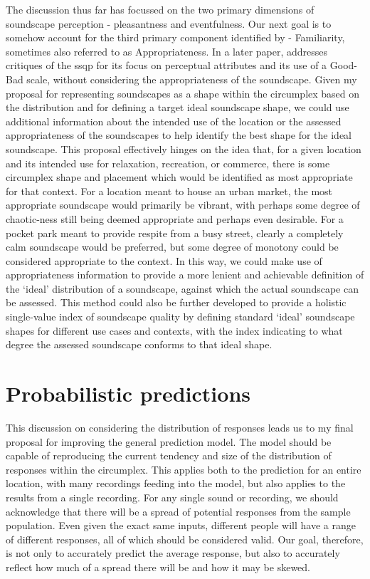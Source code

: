 The discussion thus far has focussed on the two primary dimensions of soundscape perception - pleasantness and eventfulness. Our next goal is to somehow account for the third primary component identified by \citet{Axelsson2010principal} - Familiarity, sometimes also referred to as Appropriateness. In a later paper, \citet{Axelsson2015How} addresses critiques of the \gls{ssqp} for its focus on perceptual attributes and its use of a Good-Bad scale, without considering the appropriateness of the soundscape. Given my proposal for representing soundscapes as a shape within the circumplex based on the distribution and for defining a target ideal soundscape shape, we could use additional information about the intended use of the location or the assessed appropriateness of the soundscapes to help identify the best shape for the ideal soundscape. This proposal effectively hinges on the idea that, for a given location and its intended use for relaxation, recreation, or commerce, there is some circumplex shape and placement which would be identified as most appropriate for that context. For a location meant to house an urban market, the most appropriate soundscape would primarily be vibrant, with perhaps some degree of chaotic-ness still being deemed appropriate and perhaps even desirable. For a pocket park meant to provide respite from a busy street, clearly a completely calm soundscape would be preferred, but some degree of monotony could be considered appropriate to the context. In this way, we could make use of appropriateness information to provide a more lenient and achievable definition of the `ideal' distribution of a soundscape, against which the actual soundscape can be assessed. This method could also be further developed to provide a holistic single-value index of soundscape quality by defining standard `ideal' soundscape shapes for different use cases and contexts, with the index indicating to what degree the assessed soundscape conforms to that ideal shape.

\section{Probabilistic predictions}
\label{sec:probPred}
This discussion on considering the distribution of responses leads us to my final proposal for improving the general prediction model. The model should be capable of reproducing the current tendency and size of the distribution of responses within the circumplex. This applies both to the prediction for an entire location, with many recordings feeding into the model, but also applies to the results from a single recording. For any single sound or recording, we should acknowledge that there will be a spread of potential responses from the sample population. Even given the exact same inputs, different people will have a range of different responses, all of which should be considered valid. Our goal, therefore, is not only to accurately predict the average response, but also to accurately reflect how much of a spread there will be and how it may be skewed. 

